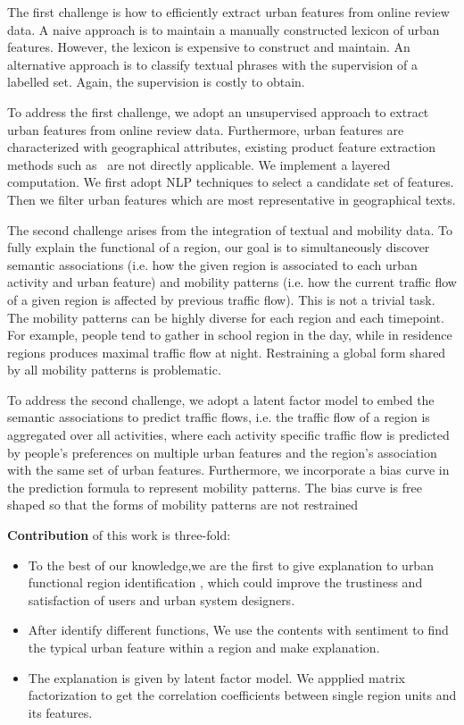 \documentclass[runningheads]{llncs}
\begin{document}
The first challenge is how to efficiently extract urban features from online review data.
A naive approach is to maintain a manually constructed lexicon of urban features.
However, the lexicon is expensive to construct and maintain.
An alternative approach is to classify textual phrases with the supervision of a labelled set.
Again, the supervision is costly to obtain.

To address the first challenge, we adopt an unsupervised approach to extract urban features from online review data.
Furthermore, urban features are characterized with geographical attributes, existing product feature extraction methods such as~\cite{Lu2011Label} are not directly applicable.
We implement a layered computation.
We first adopt NLP techniques to select a candidate set of features.  
Then we filter urban features which are most representative in geographical texts.

The second challenge arises from the integration of textual and mobility data.
To fully explain the functional of a region, our goal is to simultaneously discover semantic associations (i.e. how the given region is associated to each urban activity and urban feature) and mobility patterns (i.e. how the current traffic flow of a given region is affected by previous traffic flow).
This is not a trivial task.
The mobility patterns can be highly diverse for each region and each timepoint.
For example, people tend to gather in school region in the day, while in residence regions produces maximal traffic flow at night.
Restraining a global form shared by all mobility patterns is problematic.

To address the second challenge, we adopt a latent factor model to embed the semantic associations to predict traffic flows, i.e. the traffic flow of a region is aggregated over all activities, where each activity specific traffic flow is predicted by people's preferences on multiple urban features and the region's association with the same set of urban features.
Furthermore, we incorporate a bias curve in the prediction formula to represent mobility patterns. 
The bias curve is free shaped so that the forms of mobility patterns are not restrained


\textbf{Contribution} of this work is three-fold:
\begin{itemize}
  \item To the best of our knowledge,we are the first to give explanation to urban functional region identification , which could improve the trustiness and satisfaction of users and urban system designers.
  \item After identify different functions, We use the contents with sentiment to find the typical urban feature within a region and make explanation.
  \item The explanation is given by latent factor model. We appplied matrix factorization to get the correlation coefficients between single region units and its features.
\end{itemize}
\end{document}
